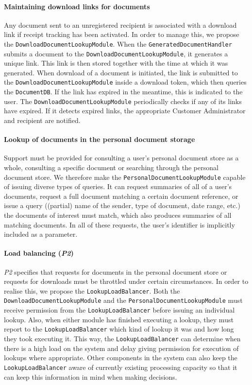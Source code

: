 \documentclass[a4paper,10pt]{article}
\begin{document}
\paragraph{Maintaining download links for documents}
Any document sent to an unregistered recipient is associated with a download link if receipt tracking has been activated. In order to manage this, we propose the \texttt{DownloadDocumentLookupModule}. When the \texttt{GeneratedDocumentHandler} submits a document to the \texttt{DownloadDocumentLookupModule}, it generates a unique link. This link is then stored together with the time at which it was generated. When download of a document is initiated, the link is submitted to the \texttt{DownloadDocumentLookupModule} inside a download token, which then queries the \texttt{DocumentDB}. If the link has expired in the meantime, this is indicated to the user. The \texttt{DownloadDocumentLookupModule} periodically checks if any of its links have expired. If it detects expired links, the appropriate Customer Administrator and recipient are notified.

\paragraph{Lookup of documents in the personal document storage}
Support must be provided for consulting a user's personal document store as a whole, consulting a specific document or searching through the personal document store. We therefore make the \texttt{PersonalDocumentLookupModule} capable of issuing diverse types of queries. It can request summaries of all of a user's documents, request a full document matching a certain document reference, or issue a query ((partial) name of the sender, type of document, date range, etc.) the documents of interest must match, which also produces summaries of all matching documents. In all of these requests, the user's identifier is implicitly included as a parameter.

\paragraph{Load balancing (\emph{P2})}
\emph{P2} specifies that requests for documents in the personal document store or requests for downloads must be throttled under certain circumstances. In order to realise this, we propose the \texttt{LookupLoadBalancer}. Both the \texttt{DownloadDocumentLookupModule} and the \texttt{PersonalDocumentLookupModule} must receive permission from the \texttt{LookupLoadBalancer} before issuing an individual lookup. Also, when either module has finished executing a lookup, they must report to the \texttt{LookupLoadBalancer} which kind of lookup it was and how long they took executing it. This way, the \texttt{LookupLoadBalancer} can determine when there is a high load on the system and delay giving permission for execution of lookups where appropriate. Other components in the system can also keep the \texttt{LookupLoadBalancer} aware of currently existing processing capacity so that it can keep this information in mind when making decisions.
\end{document}
